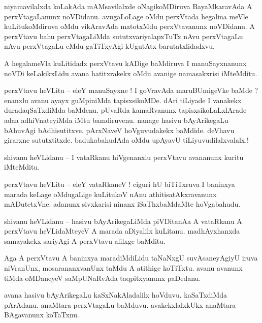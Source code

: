 \documentclass{article}
\begin{document}
\begin{mn}%
niyamavilalxda koLakAda mAMsavilalxde oNagikoMDiruva BayaMkaravAda A perxVtagaLanunx noVDidanu. 
avugaLoLage oMdu perxVtada hegalina meVle kuLitukoMdiruva oMdu vikAravAda matotxMdu perxVtavanunx 
noVDidanu. A perxVtavu bahu perxVtagaLiMda sututxvariyalapxTuTx nAvu perxVtagaLu nAvu perxVtagaLu 
eMdu gaTiTxyAgi kUgutAtx barutatxlidadxvu.
\end{mn}

\begin{mn}%
A hegalameVla kuLitidadx perxVtavu kADige baMdiruva I manuSayxnanunx noVDi keLakikxLidu avana 
hatitxrakekx oMdu avanige namasakxrisi iMteMditu.
\end{mn}

\begin{mn}%
perxVtavu heVLitu -- eleY manuSayxne ! I goVravAda maruBUmigeVke baMde ? enanxlu avanu ayayx 
guMpiniMda tapisxsikoMDe. dAri tiLiyade I vanakekx duradaqSaTxdiMda baMdenu. pUvaRda kamaRvanunx 
tapisxsikoLaLxlArade adaa adhiVnateyiMda iMtu bamdiruvenu. nanage hasivu bAyArikegaLu bAhuvAgi 
bAdhisutitxve. pArxNaveV hoVguvudakekx baMdide. deVhavu girarxne sututxtitxde. badukabahudAda oMdu 
upAyavU tiLiyuvudilalxvalalx.!
\end{mn}

\begin{mn}%
shivanu heVLidanu -- I vataRkanu hiVgenanxlu perxVtavu avananunx kuritu iMteMditu.
\end{mn}

\begin{mn}%
perxVtavu heVLitu -- eleY vataRkaneV ! ciguri hU biTiTxruva I baninxya marada keLage oMdugaLige 
kuLitukoV nAnu athitisatAkxravanunx mADutetxVne. adanunx sivxkarisi ninanx iSaThxbaMdaMte 
hoVgabahudu.
\end{mn}

\begin{mn}%
shivanu heVLidanu -- hasivu bAyArikegaLiMda piVDitanAa A vataRkanu A perxVtavu heVLidaMteyeV A 
marada aDiyalilx kuLitanu. madhAyxhanxda samayakekx sariyAgi A perxVtavu alilxge baMditu.
\end{mn}

\begin{mn}%
Aga A perxVtavu A baninxya maradiMdiLidu taNaNxgU suvAsaneyAgiyU iruva niVranUnx, mosarananxvanUnx 
taMdu A atithige koTiTxtu. avanu avanunx tiMda oMDaneyeV saMpUNaRvAda taqpitxyanunx paDedanu.
\end{mn}

\begin{mn}%
avana hasivu bAyArikegaLu kaSxNakAladalilx hoVduvu. kaSaTxdiMda pArAdanu. anaMtara perxVtagaLu 
baMduvu. avakekxlalxkUkx anaMtara BAgavanunx koTaTxnu.
\end{mn}
\end{document}
